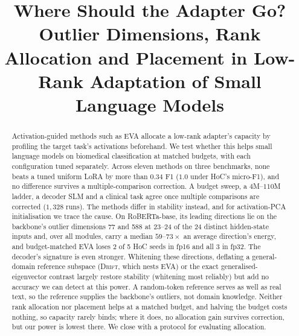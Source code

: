 \documentclass[conference]{IEEEtran}
\newcommand{\method}{\textsc{Drift}}
\begin{document}
\title{Where Should the Adapter Go?\\ Outlier Dimensions, Rank Allocation and
Placement in Low-Rank Adaptation of Small Language Models}

\author{
\and
{}
}

\maketitle

\begin{abstract}
Activation-guided methods such as EVA allocate a low-rank adapter's capacity by
profiling the target task's activations beforehand. We test whether this helps
small language models on biomedical classification at matched budgets, with each
configuration tuned separately. Across
eleven methods on three benchmarks, none beats a tuned uniform LoRA by more than
$0.34$ F1 ($1.0$ under HoC's micro-F1), and no difference survives a
multiple-comparison correction. A budget sweep, a $4$M--$110$M ladder, a decoder
SLM and a clinical task agree once multiple comparisons are corrected ($1{,}328$
runs). The methods differ in stability instead, and for activation-PCA
initialisation we trace the cause. On RoBERTa-base, its leading directions
lie on the backbone's outlier dimensions 77 and 588 at 23--24 of the 24 distinct
hidden-state inputs and, over all modules, carry a median $59$--$73\times$ an
average direction's energy, and budget-matched EVA loses 2 of 5 HoC seeds in fp16
and all 3 in fp32. The decoder's signature is even stronger. Whitening these
directions, deflating a general-domain reference subspace (\method{}, which nests
EVA) or the exact generalised-eigenvector contrast largely restore stability
(whitening most reliably) but add no accuracy we can detect at this power. A
random-token reference serves as well as real text, so the reference supplies the
backbone's outliers, not domain knowledge. Neither rank allocation nor placement
helps at a matched budget, and halving the budget costs nothing, so capacity
rarely binds; where it does, no allocation gain survives correction, but our
power is lowest there. We close with a protocol for evaluating allocation.
\end{abstract}
\end{document}
